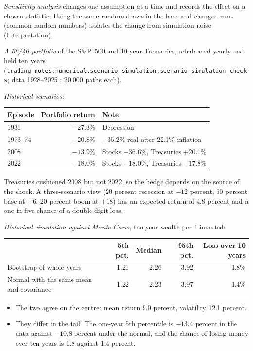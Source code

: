 \begin{qfmethod}
\emph{Sensitivity analysis} changes one assumption at a time and records the effect on a chosen statistic. Using the same random draws in the base and changed runs (common random numbers) isolates the change from simulation noise (Interpretation).

 \emph{A 60/40 portfolio} of the S\&P~500 and 10-year Treasuries, rebalanced yearly and held ten years (\nolinkurl{trading_notes.numerical.scenario_simulation.scenario_simulation_checks}; data 1928--2025 \citep[sheet ``Returns by year'']{us-asset-returns-1928-2025}; 20,000 paths each).

\emph{Historical scenarios}:
\begin{center}\small
\begin{tabular}{@{}lrl@{}}
\toprule
Episode & Portfolio return & Note \\
\midrule
1931 & $-27.3\%$ & Depression \\
1973--74 & $-20.8\%$ & $-35.2\%$ real after 22.1\% inflation \\
2008 & $-13.9\%$ & Stocks $-36.6\%$, Treasuries $+20.1\%$ \\
2022 & $-18.0\%$ & Stocks $-18.0\%$, Treasuries $-17.8\%$ \\
\bottomrule
\end{tabular}
\end{center}
Treasuries cushioned 2008 but not 2022, so the hedge depends on the source of the shock. A three-scenario view (20 percent recession at $-12$ percent, 60 percent base at $+6$, 20 percent boom at $+18$) has an expected return of 4.8 percent and a one-in-five chance of a double-digit loss.

\emph{Historical simulation against Monte Carlo}, ten-year wealth per 1 invested:
\begin{center}\small
\begin{tabular}{@{}lrrrr@{}}
\toprule
 & 5th pct. & Median & 95th pct. & Loss over 10 years \\
\midrule
Bootstrap of whole years & 1.21 & 2.26 & 3.92 & 1.8\% \\
Normal with the same mean and covariance & 1.22 & 2.23 & 3.97 & 1.4\% \\
\bottomrule
\end{tabular}
\end{center}
\begin{itemize}
\item The two agree on the centre: mean return 9.0 percent, volatility 12.1 percent.
\item They differ in the tail. The one-year 5th percentile is $-13.4$ percent in the data against $-10.8$ percent under the normal, and the chance of losing money over ten years is 1.8 against 1.4 percent.
\end{itemize}


\end{qfmethod}
